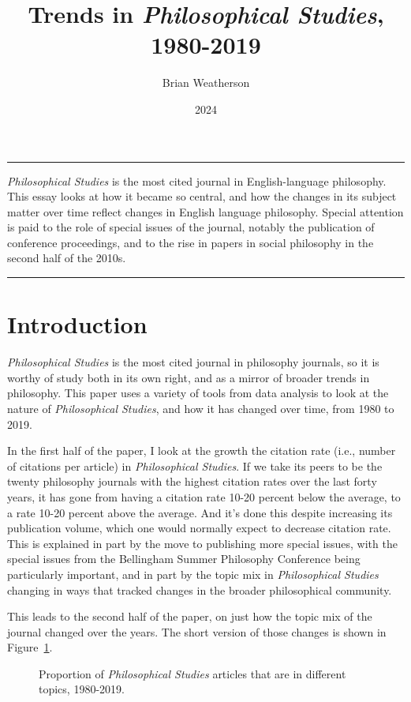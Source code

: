 \documentclass[
  10pt,
  letterpaper,
  DIV=11,
  numbers=noendperiod,
  twoside]{scrartcl}
\title{Trends in \emph{Philosophical Studies}, 1980-2019}
\author{Brian Weatherson}
\date{2024}
\renewenvironment{abstract}
 {\vspace{-1.25cm}
 \quotation\small\noindent\rule{\linewidth}{.5pt}\par\smallskip
 \noindent }
 {\par\noindent\rule{\linewidth}{.5pt}\endquotation}
\begin{document}
\maketitle
\begin{abstract}
\emph{Philosophical Studies} is the most cited journal in
English-language philosophy. This essay looks at how it became so
central, and how the changes in its subject matter over time reflect
changes in English language philosophy. Special attention is paid to the
role of special issues of the journal, notably the publication of
conference proceedings, and to the rise in papers in social philosophy
in the second half of the 2010s.
\end{abstract}

\section{Introduction}\label{sec-introduction}

\emph{Philosophical Studies} is the most cited journal in philosophy
journals, so it is worthy of study both in its own right, and as a
mirror of broader trends in philosophy. This paper uses a variety of
tools from data analysis to look at the nature of \emph{Philosophical
Studies}, and how it has changed over time, from 1980 to 2019.

In the first half of the paper, I look at the growth the citation rate
(i.e., number of citations per article) in \emph{Philosophical Studies}.
If we take its peers to be the twenty philosophy journals with the
highest citation rates over the last forty years, it has gone from
having a citation rate 10-20 percent below the average, to a rate 10-20
percent above the average. And it's done this despite increasing its
publication volume, which one would normally expect to decrease citation
rate. This is explained in part by the move to publishing more special
issues, with the special issues from the Bellingham Summer Philosophy
Conference being particularly important, and in part by the topic mix in
\emph{Philosophical Studies} changing in ways that tracked changes in
the broader philosophical community.

This leads to the second half of the paper, on just how the topic mix of
the journal changed over the years. The short version of those changes
is shown in Figure~\ref{fig-five-topics}.

\begin{figure}


\caption{\label{fig-five-topics}Proportion of \emph{Philosophical
Studies} articles that are in different topics, 1980-2019.}

\end{figure}%
\end{document}
